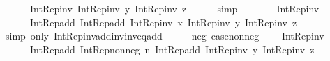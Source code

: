 \begin{isabellebody}
\ \ \ \ \ \ {\isacharparenleft}{\kern0pt}Int{\isacharunderscore}{\kern0pt}Rep{\isacharunderscore}{\kern0pt}inv\ {\isacharparenleft}{\kern0pt}Int{\isacharunderscore}{\kern0pt}Rep{\isacharunderscore}{\kern0pt}inv\ y{\isacharparenright}{\kern0pt}{\isacharparenright}{\kern0pt}{\isacharparenright}{\kern0pt}{\isacharparenright}{\kern0pt}\ {\isacharparenleft}{\kern0pt}Int{\isacharunderscore}{\kern0pt}Rep{\isacharunderscore}{\kern0pt}inv\ z{\isacharparenright}{\kern0pt}{\isacharparenright}{\kern0pt}{\isachardoublequoteclose}\isanewline
\ \ \ \ \isamarkupfalse%
\ simp\isanewline
\ \ \isamarkupfalse%
\ \isamarkupfalse%
\ {\isachardoublequoteopen}{\isachardot}{\kern0pt}{\isachardot}{\kern0pt}{\isachardot}{\kern0pt}\ {\isacharequal}{\kern0pt}\ Int{\isacharunderscore}{\kern0pt}Rep{\isacharunderscore}{\kern0pt}inv\ {\isacharparenleft}{\kern0pt}\isanewline
\ \ \ \ \ \ Int{\isacharunderscore}{\kern0pt}Rep{\isacharunderscore}{\kern0pt}add\ {\isacharparenleft}{\kern0pt}Int{\isacharunderscore}{\kern0pt}Rep{\isacharunderscore}{\kern0pt}add\ {\isacharparenleft}{\kern0pt}Int{\isacharunderscore}{\kern0pt}Rep{\isacharunderscore}{\kern0pt}inv\ x{\isacharparenright}{\kern0pt}\ {\isacharparenleft}{\kern0pt}Int{\isacharunderscore}{\kern0pt}Rep{\isacharunderscore}{\kern0pt}inv\ y{\isacharparenright}{\kern0pt}{\isacharparenright}{\kern0pt}\ {\isacharparenleft}{\kern0pt}Int{\isacharunderscore}{\kern0pt}Rep{\isacharunderscore}{\kern0pt}inv\ z{\isacharparenright}{\kern0pt}{\isacharparenright}{\kern0pt}{\isachardoublequoteclose}\isanewline
\ \ \ \ \isamarkupfalse%
\ {\isacharparenleft}{\kern0pt}simp\ only{\isacharcolon}{\kern0pt}\ Int{\isacharunderscore}{\kern0pt}Rep{\isacharunderscore}{\kern0pt}inv{\isacharunderscore}{\kern0pt}add{\isacharunderscore}{\kern0pt}inv{\isacharunderscore}{\kern0pt}inv{\isacharunderscore}{\kern0pt}eq{\isacharunderscore}{\kern0pt}add{\isacharparenright}{\kern0pt}\isanewline
\ \ \isamarkupfalse%
\ \isamarkupfalse%
\ neg\ case{\isacharunderscore}{\kern0pt}nonneg\ \isamarkupfalse%
\ {\isachardoublequoteopen}{\isachardot}{\kern0pt}{\isachardot}{\kern0pt}{\isachardot}{\kern0pt}\ {\isacharequal}{\kern0pt}\ Int{\isacharunderscore}{\kern0pt}Rep{\isacharunderscore}{\kern0pt}inv\ {\isacharparenleft}{\kern0pt}\isanewline
\ \ \ \ \ \ Int{\isacharunderscore}{\kern0pt}Rep{\isacharunderscore}{\kern0pt}add\ {\isacharparenleft}{\kern0pt}Int{\isacharunderscore}{\kern0pt}Rep{\isacharunderscore}{\kern0pt}nonneg\ n{\isacharparenright}{\kern0pt}\ {\isacharparenleft}{\kern0pt}Int{\isacharunderscore}{\kern0pt}Rep{\isacharunderscore}{\kern0pt}add\ {\isacharparenleft}{\kern0pt}Int{\isacharunderscore}{\kern0pt}Rep{\isacharunderscore}{\kern0pt}inv\ y{\isacharparenright}{\kern0pt}\ {\isacharparenleft}{\kern0pt}Int{\isacharunderscore}{\kern0pt}Rep{\isacharunderscore}{\kern0pt}inv\ z{\isacharparenright}{\kern0pt}{\isacharparenright}{\kern0pt}\isanewline

\end{isabellebody}
